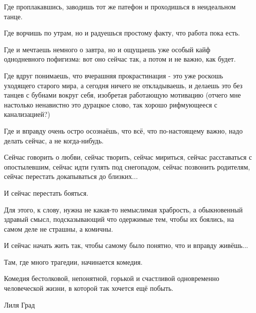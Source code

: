 Где проплакавшись, заводишь тот же патефон и проходишься в неидеальном танце. 

Где ворчишь по утрам, но и радуешься простому факту, что работа пока есть. 

Где и мечтаешь немного о завтра, но и ощущаешь уже особый кайф однодневного
пофигизма: вот оно сейчас так, а потом и не важно, как будет. 

Где вдруг понимаешь, что вчерашняя прокрастинация - это уже роскошь уходящего
старого мира, а сегодня ничего не откладываешь, и делаешь это без танцев с
бубнами вокруг себя, изобретая работающую мотивацию (отчего мне настолько
ненавистно это дурацкое слово, так хорошо рифмующееся с канализацией?) 

Где и вправду очень остро осознаёшь, что всё, что по-настоящему важно, надо
делать сейчас, а не когда-нибудь. 

Сейчас говорить о любви, сейчас творить, сейчас мириться, сейчас расставаться с
опостылевшим, сейчас идти гулять под снегопадом, сейчас позвонить родителям,
сейчас перестать докапываться до близких... 

И сейчас перестать бояться. 

Для этого, к слову, нужна не какая-то немыслимая храбрость, а обыкновенный
здравый смысл, подсказывающий что одержимые тем, чтобы их боялись, на самом
деле не страшны, а комичны. 

И сейчас начать жить так, чтобы самому было понятно, что и вправду живёшь... 

Там, где много трагедии, начинается комедия. 

Комедия бестолковой, непонятной, горькой и счастливой одновременно человеческой
жизни, в которой так хочется ещё побыть. 

Лиля Град
